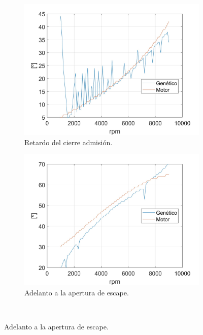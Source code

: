 \begin{figure}[H]
    \centering
    \begin{subfigure}[b]{0.45\textwidth}
        \centering
        \includegraphics[width=\linewidth]{Figures/01/opti_RCA.jpg}
        \caption{Retardo del cierre admisión.}
        \label{fig:opti_RCA}
    \end{subfigure}
    \hfill
    \begin{subfigure}[b]{0.45\textwidth}
        \centering
        \includegraphics[width=\linewidth]{Figures/01/opti_AAE.jpg}
        \caption{Adelanto a la apertura de escape.}
        \label{fig:opti_AAE}
    \end{subfigure}
    \\

\end{figure}
